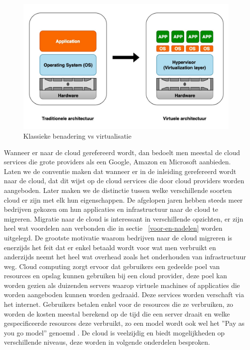 \newline
\newline
\begin{figure}
    \includegraphics[width=1\textwidth]{img/klassiek_virtualisatie}
    \caption{Klassieke benadering vs virtualisatie} 
    \label{fig:klassiek-vs-virtualisatie}  
\end{figure}
\newline

Wanneer er naar de cloud gerefereerd wordt, dan bedoelt men meestal de cloud services die grote providers als een Google, Amazon en Microsoft aanbieden. Laten we de conventie maken dat wanneer er in de inleiding gerefereerd wordt naar de cloud, dat dit wijst op de cloud services die door cloud providers worden aangeboden. Later maken we de distinctie tussen welke verschillende soorten cloud er zijn met elk hun eigenschappen. De afgelopen jaren hebben steeds meer bedrijven gekozen om hun applicaties en infrastructuur naar de cloud te migreren. Migratie naar de cloud is interessant in verschillende opzichten, er zijn heel wat voordelen aan verbonden die in sectie ~\ref{voor-en-nadelen} worden uitgelegd. De grootste motivatie waarom bedrijven naar de cloud migreren is enerzijds het feit dat er enkel betaald wordt voor wat men verbruikt en anderzijds neemt het heel wat overhead zoals het onderhouden van infrastructuur weg. Cloud computing zorgt ervoor dat gebruikers een gedeelde poel van resources en opslag kunnen gebruiken bij een cloud provider, deze poel kan worden gezien als duizenden servers waarop virtuele machines of applicaties die worden aangeboden kunnen worden gedraaid. Deze services worden verschaft via het internet. Gebruikers betalen enkel voor de resources die ze verbruiken, zo worden de kosten meestal berekend op de tijd die een server draait en welke gespecificeerde resources deze verbruikt, zo een model wordt ook wel het ''Pay as you go model'' genoemd . De cloud is veelzijdig en biedt mogelijkheden op verschillende niveaus, deze worden in volgende onderdelen besproken.\autocite{Seghal2018} 


